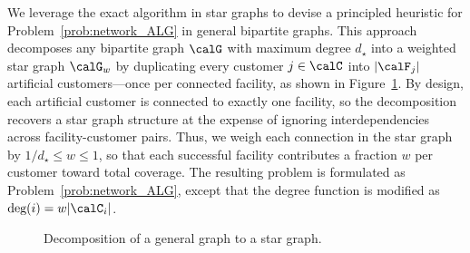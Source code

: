 \documentclass[blindrev]{informs3noheader}
\begin{document}
We leverage the exact algorithm in star graphs to devise a principled heuristic for Problem~\eqref{prob:network_ALG} in general bipartite graphs. This approach decomposes any bipartite graph $\calG$ with maximum degree $d_\star$ into a weighted star graph $\calG_w$ by duplicating every customer $j\in\calC$ into $|\calF_j|$ artificial customers---once per connected facility, as shown in Figure~\ref{fig:graph_decompose}. By design, each artificial customer is connected to exactly one facility, so the decomposition recovers a star graph structure at the expense of ignoring interdependencies across facility-customer pairs. Thus, we weigh each connection in the star graph by $1/d_\star\leq w \leq 1$, so that each successful facility contributes a fraction $w$ per customer toward total coverage. The resulting problem is formulated as Problem~\eqref{prob:network_ALG}, except that the degree function is modified as $\text{deg}(i)=w|\calC_i|$.

\begin{figure}[h!]
\centering
{}
\caption{Decomposition of a general graph to a star graph.}\label{fig:graph_decompose}
\end{figure}
\end{document}
